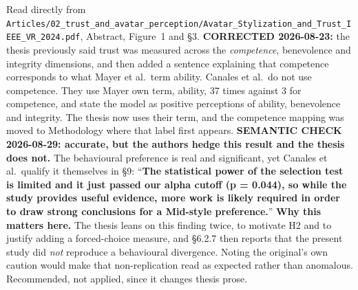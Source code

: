 \documentclass[11pt, a4paper]{article}
\begin{document}
\begin{Form}
  {Read directly from \texttt{\footnotesize Articles/02\_trust\_and\_avatar\_perception/Avatar\_Stylization\_and\_Trust\_IEEE\_VR\_2024.pdf}, Abstract, Figure~1 and \S3. \textbf{CORRECTED 2026-08-23:} the thesis previously said trust was measured across the \emph{competence}, benevolence and integrity dimensions, and then added a sentence explaining that competence corresponds to what Mayer et al.\ term ability. Canales et al.\ do not use competence. They use Mayer own term, ability, 37 times against 3 for competence, and state the model as positive perceptions of ability, benevolence and integrity. The thesis now uses their term, and the competence mapping was moved to Methodology where that label first appears. \textbf{SEMANTIC CHECK 2026-08-29: accurate, but the authors hedge this result and the thesis does not.} The behavioural preference is real and significant, yet Canales et al.\ qualify it themselves in \S9: ``\textbf{The statistical power of the selection test is limited and it just passed our alpha cutoff (p = 0.044), so while the study provides useful evidence, more work is likely required in order to draw strong conclusions for a Mid-style preference.}'' \textbf{Why this matters here.} The thesis leans on this finding twice, to motivate H2 and to justify adding a forced-choice measure, and \S6.2.7 then reports that the present study did \emph{not} reproduce a behavioural divergence. Noting the original's own caution would make that non-replication read as expected rather than anomalous. Recommended, not applied, since it changes thesis prose.}



\end{Form}
\end{document}
